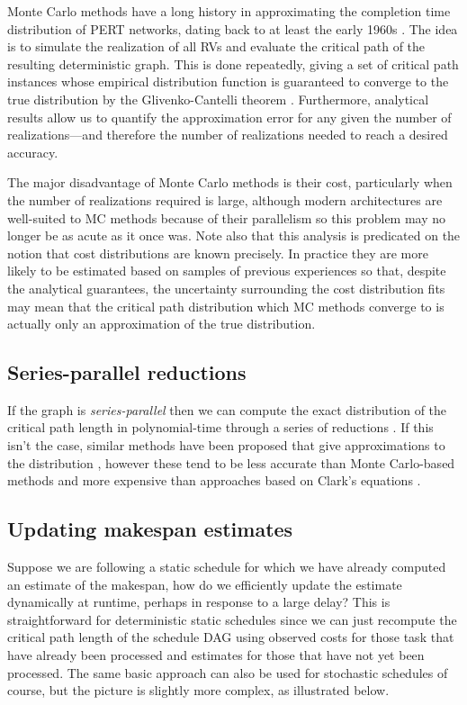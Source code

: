 \documentclass[12pt]{article}
\begin{document}
Monte Carlo methods have a long history in approximating the completion time distribution of PERT networks, dating back to at least the early 1960s \cite{van63}. The idea is to simulate the realization of all RVs and evaluate the critical path of the resulting deterministic graph. This is done repeatedly, giving a set of critical path instances whose empirical distribution function is guaranteed to converge to the true distribution by the Glivenko-Cantelli theorem \cite{can16}. Furthermore, analytical results allow us to quantify the approximation error for any given the number of realizations---and therefore the number of realizations needed to reach a desired accuracy.

The major disadvantage of Monte Carlo methods is their cost, particularly when the number of realizations required is large, although modern architectures are well-suited to MC methods because of their parallelism so this problem may no longer be as acute as it once was. Note also that this analysis is predicated on the notion that cost distributions are known precisely. In practice they are more likely to be estimated based on samples of previous experiences so that, despite the analytical guarantees, the uncertainty surrounding the cost distribution fits may mean that the critical path distribution which MC methods converge to is actually only an approximation of the true distribution. 

\subsection{Series-parallel reductions}
\label{subsect.stochastic_series_parallel} 

If the graph is {\em series-parallel} then we can compute the exact distribution of the critical path length in polynomial-time through a series of reductions \cite{dod85,mar65}. If this isn't the case, similar methods have been proposed that give approximations to the distribution \cite{dod85,lud01}, however these tend to be less accurate than Monte Carlo-based methods and more expensive than approaches based on Clark's equations \cite{can16}. 

\subsection{Updating makespan estimates}
\label{subsect.other_updating}

Suppose we are following a static schedule for which we have already computed an estimate of the makespan, how do we efficiently update the estimate dynamically at runtime, perhaps in response to a large delay? This is straightforward for deterministic static schedules since we can just recompute the critical path length of the schedule DAG using observed costs for those task that have already been processed and estimates for those that have not yet been processed. The same basic approach can also be used for stochastic schedules of course, but the picture is slightly more complex, as illustrated below.    
\end{document}
